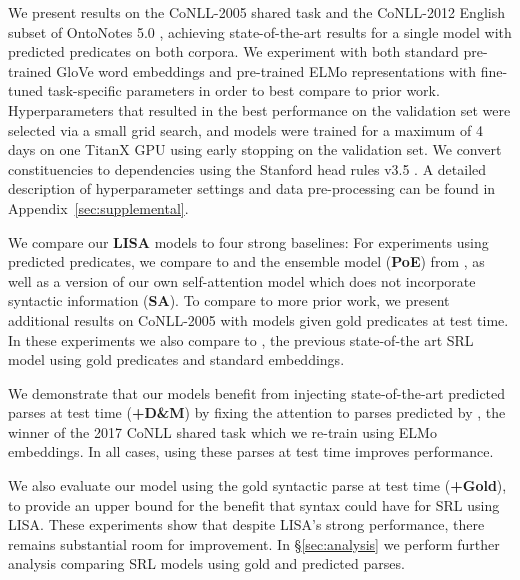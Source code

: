 \documentclass[11pt,a4paper]{article}
\newcommand{\todo}[1]{\textcolor{red}{TODO: #1}}
\begin{document}
We present results on the CoNLL-2005 shared task \citep{carreras2005introduction} and the CoNLL-2012 English subset of OntoNotes 5.0 \citep{pradhan2013towards}, achieving state-of-the-art results for a single model with predicted predicates on both corpora. We experiment with both standard pre-trained GloVe word embeddings \citep{pennington2014glove} and pre-trained ELMo representations with fine-tuned task-specific parameters \citep{peters2018deep} in order to best compare to prior work. Hyperparameters that resulted in the best performance on the validation set were selected via a small grid search, and models were trained for a maximum of 4 days on one TitanX GPU using early stopping on the validation set.
We convert constituencies to dependencies using the Stanford head rules v3.5 \citep{deMarneffe2008}. A detailed description of hyperparameter settings and data pre-processing can be found in Appendix~\ref{sec:supplemental}.

We compare our {\bf LISA} models to four strong baselines: For experiments using predicted predicates, we compare to \citet{he2018jointly} and the ensemble model ({\bf PoE}) from \citet{he2017deep}, as well as a version of our own self-attention model which does not incorporate syntactic information ({\bf SA}). To compare to more prior work, we present additional results on CoNLL-2005 with models given gold predicates at test time. In these experiments we also compare to \citet{tan2018deep}, the previous state-of-the art SRL model using gold predicates and standard embeddings.

We demonstrate that our models benefit from injecting state-of-the-art predicted parses at test time ({\bf +D\&M}) by fixing the attention to parses predicted by \citet{dozat2017deep}, the winner of the 2017 CoNLL shared task \citep{zeman2017conll} which we re-train using ELMo embeddings. In all cases, using these parses at test time improves performance. 

We also evaluate our model using the gold syntactic parse at test time ({\bf +Gold}), to provide an upper bound for the benefit that syntax could have for SRL using LISA. These experiments show that despite LISA's strong performance, there remains substantial room for improvement. In \S\ref{sec:analysis} we perform further analysis comparing SRL models using gold and predicted parses.
\end{document}
